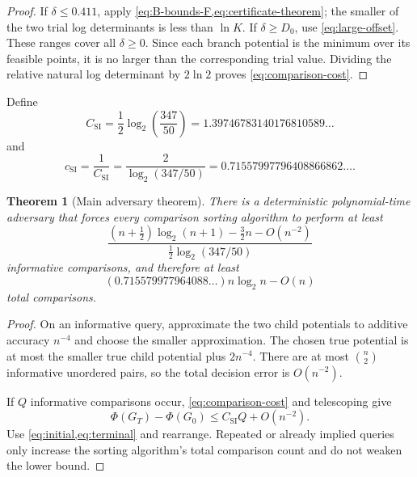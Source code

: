 \documentclass[11pt]{article}
\newtheorem{theorem}{Theorem}[section]
\theoremstyle{definition}
\newcommand{\PhiV}{\Phi}
\newcommand{\Ccert}{C_{\mathrm{SI}}}
\newcommand{\ccert}{c_{\mathrm{SI}}}
\begin{document}
\begin{proof}
If $\delta\le0.411$, apply \cref{eq:B-bounds-F,eq:certificate-theorem}; the smaller of the two trial log determinants is less than $\ln K$.  If $\delta\ge D_0$, use \cref{eq:large-offset}.  These ranges cover all $\delta\ge0$.  Since each branch potential is the minimum over its feasible points, it is no larger than the corresponding trial value.  Dividing the relative natural log determinant by $2\ln2$ proves \cref{eq:comparison-cost}.
\end{proof}

Define
\begin{equation}
  \Ccert=\frac12\log_2\!\left(\frac{347}{50}\right)
  =1.39746783140176810589\ldots
  \label{eq:Ccert}
\end{equation}
and
\begin{equation}
  \ccert=\frac1{\Ccert}
  =\frac{2}{\log_2(347/50)}
  =0.71557997796408866862\ldots .
  \label{eq:ccert}
\end{equation}

\begin{theorem}[Main adversary theorem]
There is a deterministic polynomial-time adversary that forces every comparison sorting algorithm to perform at least
\begin{equation}
  \boxed{
  \frac{
  \left(n+\frac12\right)\log_2(n+1)-\frac32n-O(n^{-2})
  }{
  \frac12\log_2(347/50)
  }
  }
  \label{eq:finite-main}
\end{equation}
informative comparisons, and therefore at least
\begin{equation}
  \boxed{
  \left(0.715579977964088\ldots\right)n\log_2n-O(n)
  }
  \label{eq:asymptotic-main}
\end{equation}
total comparisons.
\end{theorem}

\begin{proof}
On an informative query, approximate the two child potentials to additive accuracy $n^{-4}$ and choose the smaller approximation.  The chosen true potential is at most the smaller true child potential plus $2n^{-4}$.  There are at most $\binom n2$ informative unordered pairs, so the total decision error is $O(n^{-2})$.

If $Q$ informative comparisons occur, \cref{eq:comparison-cost} and telescoping give
\[
  \PhiV(G_T)-\PhiV(G_0)
  \le \Ccert Q+O(n^{-2}).
\]
Use \cref{eq:initial,eq:terminal} and rearrange.  Repeated or already implied queries only increase the sorting algorithm's total comparison count and do not weaken the lower bound.
\end{proof}
\end{document}
